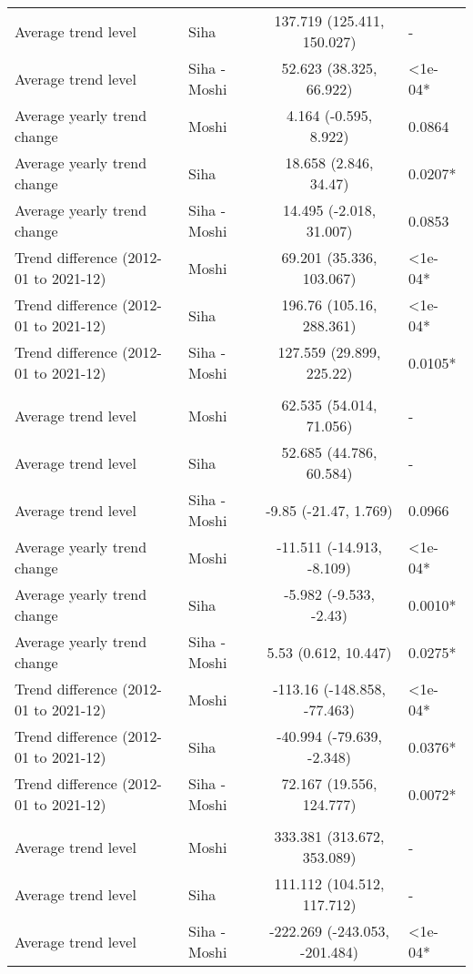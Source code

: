 \begin{longtable}{l|lcl}
Average trend level & Siha & 137.719 (125.411, 150.027) & - \\ 
Average trend level & Siha - Moshi & 52.623 (38.325, 66.922) & <1e-04* \\ 
Average yearly trend change & Moshi & 4.164 (-0.595, 8.922) & 0.0864 \\ 
Average yearly trend change & Siha & 18.658 (2.846, 34.47) & 0.0207* \\ 
Average yearly trend change & Siha - Moshi & 14.495 (-2.018, 31.007) & 0.0853 \\ 
Trend difference (2012-01 to 2021-12) & Moshi & 69.201 (35.336, 103.067) & <1e-04* \\ 
Trend difference (2012-01 to 2021-12) & Siha & 196.76 (105.16, 288.361) & <1e-04* \\ 
Trend difference (2012-01 to 2021-12) & Siha - Moshi & 127.559 (29.899, 225.22) & 0.0105* \\ 
\midrule\addlinespace[2.5pt]
\multicolumn{4}{l}{Malnutrition} \\[2.5pt] 
\midrule\addlinespace[2.5pt]
Average trend level & Moshi & 62.535 (54.014, 71.056) & - \\ 
Average trend level & Siha & 52.685 (44.786, 60.584) & - \\ 
Average trend level & Siha - Moshi & -9.85 (-21.47, 1.769) & 0.0966 \\ 
Average yearly trend change & Moshi & -11.511 (-14.913, -8.109) & <1e-04* \\ 
Average yearly trend change & Siha & -5.982 (-9.533, -2.43) & 0.0010* \\ 
Average yearly trend change & Siha - Moshi & 5.53 (0.612, 10.447) & 0.0275* \\ 
Trend difference (2012-01 to 2021-12) & Moshi & -113.16 (-148.858, -77.463) & <1e-04* \\ 
Trend difference (2012-01 to 2021-12) & Siha & -40.994 (-79.639, -2.348) & 0.0376* \\ 
Trend difference (2012-01 to 2021-12) & Siha - Moshi & 72.167 (19.556, 124.777) & 0.0072* \\ 
\midrule\addlinespace[2.5pt]
\multicolumn{4}{l}{Neurological} \\[2.5pt] 
\midrule\addlinespace[2.5pt]
Average trend level & Moshi & 333.381 (313.672, 353.089) & - \\ 
Average trend level & Siha & 111.112 (104.512, 117.712) & - \\ 
Average trend level & Siha - Moshi & -222.269 (-243.053, -201.484) & <1e-04* \\ 

\end{longtable}
